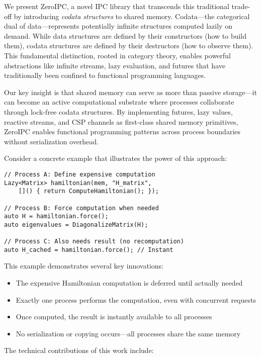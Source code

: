 \documentclass[letterpaper,twocolumn,10pt]{article}
\newcommand{\projectname}{ZeroIPC}
\begin{document}
We present \projectname{}, a novel IPC library that transcends this traditional trade-off by introducing \emph{codata structures} to shared memory. Codata---the categorical dual of data---represents potentially infinite structures computed lazily on demand. While data structures are defined by their constructors (how to build them), codata structures are defined by their destructors (how to observe them). This fundamental distinction, rooted in category theory, enables powerful abstractions like infinite streams, lazy evaluation, and futures that have traditionally been confined to functional programming languages.

Our key insight is that shared memory can serve as more than passive storage---it can become an active computational substrate where processes collaborate through lock-free codata structures. By implementing futures, lazy values, reactive streams, and CSP channels as first-class shared memory primitives, \projectname{} enables functional programming patterns across process boundaries without serialization overhead.

Consider a concrete example that illustrates the power of this approach:

\begin{lstlisting}[caption={Cross-Process Lazy Computation},label={lst:intro-example}]
// Process A: Define expensive computation
Lazy<Matrix> hamiltonian(mem, "H_matrix",
    []() { return ComputeHamiltonian(); });

// Process B: Force computation when needed
auto H = hamiltonian.force();
auto eigenvalues = DiagonalizeMatrix(H);

// Process C: Also needs result (no recomputation)
auto H_cached = hamiltonian.force(); // Instant
\end{lstlisting}

This example demonstrates several key innovations:
\begin{itemize}
\item The expensive Hamiltonian computation is deferred until actually needed
\item Exactly one process performs the computation, even with concurrent requests
\item Once computed, the result is instantly available to all processes
\item No serialization or copying occurs---all processes share the same memory
\end{itemize}

The technical contributions of this work include:
\end{document}
